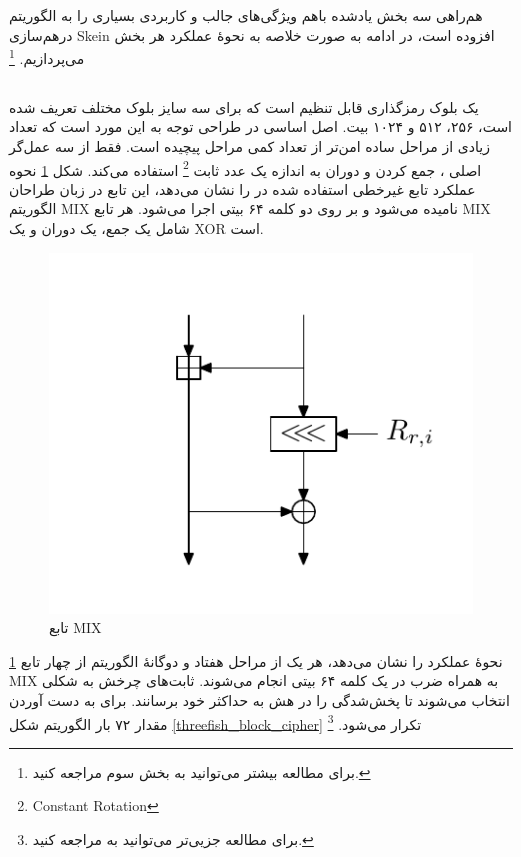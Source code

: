 هم‌راهی سه بخش یادشده باهم ویژگی‌های جالب و کاربردی بسیاری را به الگوریتم درهم‌سازی 
Skein 
افزوده است، در ادامه به صورت خلاصه به نحوهٔ عملکرد هر بخش می‌پردازیم.
\footnote{برای مطالعه بیشتر می‌توانید به بخش سوم 
	\cite{main_doc} مراجعه کنید. }


\subsection{}
یک بلوک رمزگذاری قابل تنظیم است که برای سه سایز بلوک مختلف تعریف شده است، ۲۵۶، ۵۱۲ و ۱۰۲۴ بیت. 
اصل اساسی در طراحی 
توجه به این مورد است که تعداد زیادی از مراحل ساده امن‌تر از تعداد کمی مراحل پیچیده است.
فقط از سه عمل‌گر اصلی 
، جمع کردن و دوران به اندازه یک عدد ثابت
\footnote{Constant Rotation}
استفاده می‌کند. 
شکل 
\ref{threefish_mix_function}
نحوه عملکرد تابع غیرخطی استفاده شده در 
را نشان می‌دهد، این تابع در زبان طراحان الگوریتم 
MIX
نامیده می‌شود و بر روی دو کلمه ۶۴ بیتی اجرا می‌شود. هر تابع 
MIX
شامل یک جمع، یک دوران و یک 
XOR
است. 
\begin{figure}
	\centering
	\includegraphics[scale=0.7]{figs/threefish_mix_function.png}
	\caption{تابع MIX}
	\label{threefish_mix_function}
\end{figure}

\ref{threefish_mix_function}
نحوهٔ عملکرد 
را نشان می‌دهد، هر یک از مراحل هفتاد و دوگانهٔ الگوریتم
از چهار تابع MIX
به همراه ضرب در یک کلمه ۶۴ بیتی انجام می‌شوند. ثابت‌های چرخش به شکلی انتخاب می‌شوند تا پخش‌شدگی را در هش به حداکثر خود برسانند. 
برای به دست آوردن مقدار 
۷۲ بار الگوریتم شکل
\ref{threefish_block_cipher}
تکرار می‌شود.
\footnote{برای مطالعه جزیی‌تر می‌توانید به 
	\cite{main_doc}
مراجعه کنید.}

